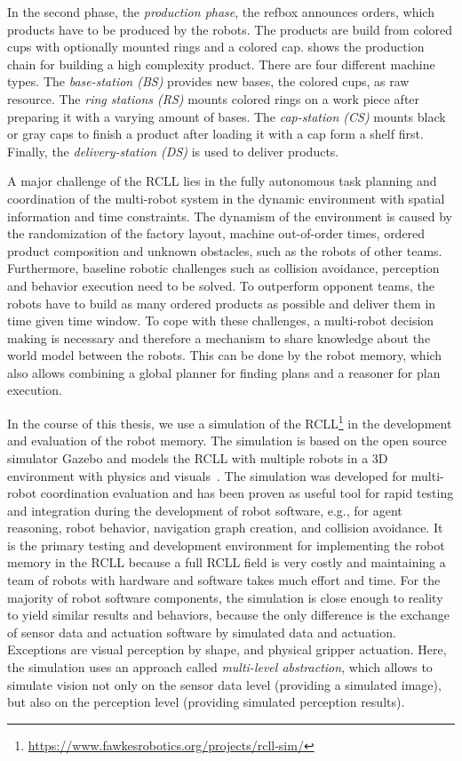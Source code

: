 In the second phase, the \emph{production phase}, the refbox announces
orders, which products have to be produced by the robots. The products
are build from colored cups with optionally mounted rings and a
colored cap.   shows the production chain for
building a high complexity product.  There are four different machine
types. The \emph{base-station (BS)} provides new bases, the colored
cups, as raw resource. The \emph{ring stations (RS)} mounts colored
rings on a work piece after preparing it with a varying amount of
bases.  The \emph{cap-station (CS)} mounts black or gray caps to
finish a product after loading it with a cap form a shelf first.
Finally, the \emph{delivery-station (DS)} is used to deliver products.

A major challenge of the RCLL lies in the fully autonomous task
planning and coordination of the multi-robot system in the dynamic
environment with spatial information and time constraints. The
dynamism of the environment is caused by the randomization of the factory
layout, machine out-of-order times, ordered product composition and
unknown obstacles, such as the robots of other teams. Furthermore,
baseline robotic challenges such as collision avoidance, perception
and behavior execution need to be solved. To outperform opponent
teams, the robots have to build as many ordered products as possible
and deliver them in time given time window.  To cope with these
challenges, a multi-robot decision making is necessary and therefore a
mechanism to share knowledge about the world model between the
robots. This can be done by the robot memory, which also allows
combining a global planner for finding plans and a reasoner for plan
execution.

In the course of this thesis, we use a simulation of the
RCLL\footnote{\url{https://www.fawkesrobotics.org/projects/rcll-sim/}}
in the development and evaluation of the robot memory. The simulation
is based on the open source simulator Gazebo and models the RCLL with
multiple robots in a 3D environment with physics and
visuals~\cite{Gazebo-Design,Gazsim-Thesis,LLSF-Sim}. The simulation
was developed for multi-robot coordination evaluation and has
been proven as useful tool for rapid testing and integration during
the development of robot software, e.g., for agent reasoning, robot
behavior, navigation graph creation, and collision avoidance. It is
the primary testing and development environment for implementing the
robot memory in the RCLL because a full RCLL field is very costly and
maintaining a team of robots with hardware and software takes much
effort and time. For the majority of robot software components, the
simulation is close enough to reality to yield similar results and
behaviors, because the only difference is the exchange of sensor data
and actuation software by simulated data and actuation. Exceptions are
visual perception by shape, and physical gripper actuation. Here, the
simulation uses an approach called \emph{multi-level abstraction},
which allows to simulate vision not only on the sensor data level
(providing a simulated image), but also on the perception level
(providing simulated perception results).

